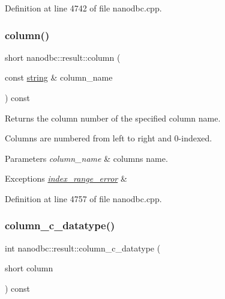 Definition at line 4742 of file nanodbc.\+cpp.

\mbox{\label{classnanodbc_1_1result_ae4e254b2db63c65473cc058de3d5a844}} 
\subsubsection{\texorpdfstring{column()}{column()}}
{\footnotesize\ttfamily short nanodbc\+::result\+::column (\begin{DoxyParamCaption}\item[{const \mbox{\hyperlink{namespacenanodbc_abfc0ece56278e590911ec8352774c212}{string}} \&}]{column\+\_\+name }\end{DoxyParamCaption}) const}



Returns the column number of the specified column name. 

Columns are numbered from left to right and 0-\/indexed. 
\begin{DoxyParams}{Parameters}
{\em column\+\_\+name} & column\textquotesingle{}s name. \\
\hline
\end{DoxyParams}

\begin{DoxyExceptions}{Exceptions}
{\em \mbox{\hyperlink{classnanodbc_1_1index__range__error}{index\+\_\+range\+\_\+error}}} & \\
\hline
\end{DoxyExceptions}


Definition at line 4757 of file nanodbc.\+cpp.

\mbox{\label{classnanodbc_1_1result_a094ee5a13d83c0aeabd8ccab4c4e130c}} 
\subsubsection{\texorpdfstring{column\_c\_datatype()}{column\_c\_datatype()}\hspace{0.1cm}{\footnotesize\ttfamily [1/2]}}
{\footnotesize\ttfamily int nanodbc\+::result\+::column\+\_\+c\+\_\+datatype (\begin{DoxyParamCaption}\item[{short}]{column }\end{DoxyParamCaption}) const}



